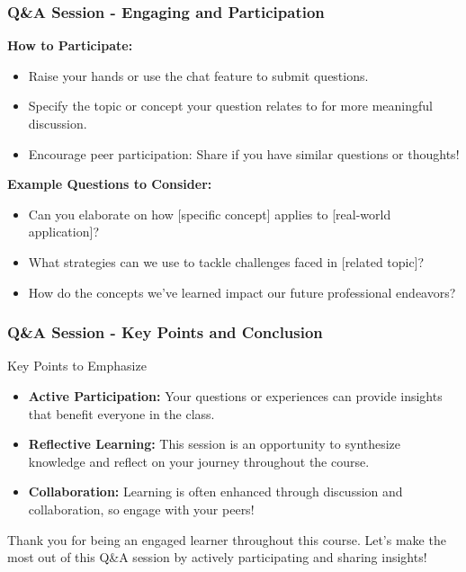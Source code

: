 \documentclass[aspectratio=169]{beamer}
\begin{document}
\begin{frame}[fragile]
    \frametitle{Q\&A Session - Engaging and Participation}
    \textbf{How to Participate:}
    \begin{itemize}
        \item Raise your hands or use the chat feature to submit questions.
        \item Specify the topic or concept your question relates to for more meaningful discussion.
        \item Encourage peer participation: Share if you have similar questions or thoughts!
    \end{itemize}
    
    \textbf{Example Questions to Consider:}
    \begin{itemize}
        \item Can you elaborate on how [specific concept] applies to [real-world application]?
        \item What strategies can we use to tackle challenges faced in [related topic]?
        \item How do the concepts we've learned impact our future professional endeavors?
    \end{itemize}
\end{frame}

\begin{frame}[fragile]
    \frametitle{Q\&A Session - Key Points and Conclusion}
    \begin{block}{Key Points to Emphasize}
        \begin{itemize}
            \item \textbf{Active Participation:} Your questions or experiences can provide insights that benefit everyone in the class.
            \item \textbf{Reflective Learning:} This session is an opportunity to synthesize knowledge and reflect on your journey throughout the course.
            \item \textbf{Collaboration:} Learning is often enhanced through discussion and collaboration, so engage with your peers!
        \end{itemize}
    \end{block}
    
    Thank you for being an engaged learner throughout this course. Let's make the most out of this Q\&A session by actively participating and sharing insights!
\end{frame}
\end{document}
